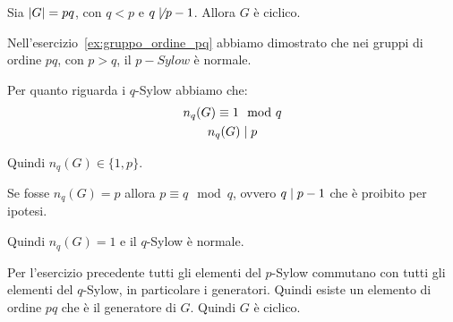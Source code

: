 \begin{esercizio}
    Sia $\lvert G \rvert = pq$, con $q < p$ e $q \not\mid p-1$.
    Allora $G$ è ciclico.
\end{esercizio}
\begin{soluzione}
    Nell'esercizio~\ref{ex:gruppo_ordine_pq} abbiamo dimostrato che nei gruppi di ordine $pq$, con $p > q$,
    il $p-Sylow$ è normale.

    Per quanto riguarda i $q$-Sylow abbiamo che:
    \begin{gather*}
        n_q(G) \equiv 1 \mod q \\
        n_q(G) \mid p
    \end{gather*}

    Quindi $n_q(G) \in \{1, p\}$.

    Se fosse $n_q(G) = p$ allora $p \equiv q \mod q$, ovvero $q \mid p-1$ che è proibito per ipotesi.

    Quindi $n_q(G) = 1$ e il $q$-Sylow è normale.

    Per l'esercizio precedente tutti gli elementi del $p$-Sylow commutano con tutti gli elementi del $q$-Sylow, in
    particolare i generatori.
    Quindi esiste un elemento di ordine $pq$ che è il generatore di $G$.
    Quindi $G$ è ciclico.
\end{soluzione}